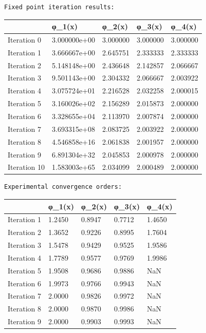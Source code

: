 \documentclass[
  letterpaper,
  DIV=11,
  numbers=noendperiod]{scrartcl}
\begin{document}
\begin{verbatim}
Fixed point iteration results:
\end{verbatim}

\begin{longtable}[]{@{}lllll@{}}
\toprule\noalign{}
& φ\_1(x) & φ\_2(x) & φ\_3(x) & φ\_4(x) \\
\midrule\noalign{}
\endhead
\bottomrule\noalign{}
\endlastfoot
Iteration 0 & 3.000000e+00 & 3.000000 & 3.000000 & 3.000000 \\
Iteration 1 & 3.666667e+00 & 2.645751 & 2.333333 & 2.333333 \\
Iteration 2 & 5.148148e+00 & 2.436648 & 2.142857 & 2.066667 \\
Iteration 3 & 9.501143e+00 & 2.304332 & 2.066667 & 2.003922 \\
Iteration 4 & 3.075724e+01 & 2.216528 & 2.032258 & 2.000015 \\
Iteration 5 & 3.160026e+02 & 2.156289 & 2.015873 & 2.000000 \\
Iteration 6 & 3.328655e+04 & 2.113970 & 2.007874 & 2.000000 \\
Iteration 7 & 3.693315e+08 & 2.083725 & 2.003922 & 2.000000 \\
Iteration 8 & 4.546858e+16 & 2.061838 & 2.001957 & 2.000000 \\
Iteration 9 & 6.891304e+32 & 2.045853 & 2.000978 & 2.000000 \\
Iteration 10 & 1.583003e+65 & 2.034099 & 2.000489 & 2.000000 \\
\end{longtable}

\begin{verbatim}
Experimental convergence orders:
\end{verbatim}

\begin{longtable}[]{@{}lllll@{}}
\toprule\noalign{}
& φ\_1(x) & φ\_2(x) & φ\_3(x) & φ\_4(x) \\
\midrule\noalign{}
\endhead
\bottomrule\noalign{}
\endlastfoot
Iteration 1 & 1.2450 & 0.8947 & 0.7712 & 1.4650 \\
Iteration 2 & 1.3652 & 0.9226 & 0.8995 & 1.7604 \\
Iteration 3 & 1.5478 & 0.9429 & 0.9525 & 1.9586 \\
Iteration 4 & 1.7789 & 0.9577 & 0.9769 & 1.9986 \\
Iteration 5 & 1.9508 & 0.9686 & 0.9886 & NaN \\
Iteration 6 & 1.9973 & 0.9766 & 0.9943 & NaN \\
Iteration 7 & 2.0000 & 0.9826 & 0.9972 & NaN \\
Iteration 8 & 2.0000 & 0.9870 & 0.9986 & NaN \\
Iteration 9 & 2.0000 & 0.9903 & 0.9993 & NaN \\
\end{longtable}
\end{document}
